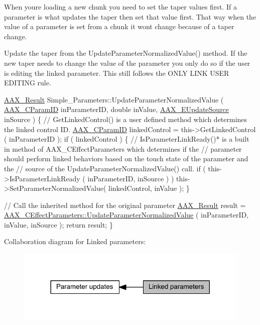 \begin{DoxyEnumerate}
\item When you\textquotesingle{}re loading a new chunk you need to set the taper values first. If a parameter is what updates the taper then set that value first. That way when the value of a parameter is set from a chunk it wont change because of a taper change.
\item Update the taper from the Update\+Parameter\+Normalized\+Value() method. If the new taper needs to change the value of the parameter you only do so if the user is editing the linked parameter. This still follows the O\+N\+L\+Y L\+I\+N\+K U\+S\+E\+R E\+D\+I\+T\+I\+N\+G rule.
\end{DoxyEnumerate}


\begin{DoxyCode}
\hyperlink{a00149_a4d8f69a697df7f70c3a8e9b8ee130d2f}{AAX\_Result} Simple\_Parameters::UpdateParameterNormalizedValue ( 
      \hyperlink{a00149_a1440c756fe5cb158b78193b2fc1780d1}{AAX\_CParamID} inParameterID, \textcolor{keywordtype}{double} inValue, \hyperlink{a00206_a30be0398faf20c6b121239eb9399f3f7}{AAX\_EUpdateSource} inSource )
\{
    \textcolor{comment}{// GetLinkedControl() is a user defined method which determines the linked control ID.}
    \hyperlink{a00149_a1440c756fe5cb158b78193b2fc1780d1}{AAX\_CParamID} linkedControl = this->GetLinkedControl ( inParameterID );
    \textcolor{keywordflow}{if} ( linkedControl )
    \{
        \textcolor{comment}{// IsParameterLinkReady()* is a built in method of AAX\_CEffectParameters which determines if the }
        \textcolor{comment}{// parameter should perform linked behaviors based on the touch state of the parameter and the }
        \textcolor{comment}{// source of the UpdateParameterNormalizedValue() call.}
        \textcolor{keywordflow}{if} ( this->IsParameterLinkReady ( inParameterID, inSource ) )
            this->SetParameterNormalizedValue( linkedControl, inValue );
    \}

    \textcolor{comment}{// Call the inherited method for the original parameter}
    \hyperlink{a00149_a4d8f69a697df7f70c3a8e9b8ee130d2f}{AAX\_Result}   result = 
      \hyperlink{a00018_a56a9f41a975b48f583655db7b43aae5a}{AAX\_CEffectParameters::UpdateParameterNormalizedValue} 
      ( inParameterID, inValue, inSource );
    \textcolor{keywordflow}{return} result;
\}
\end{DoxyCode}
 Collaboration diagram for Linked parameters\+:
\nopagebreak
\begin{figure}[H]
\begin{center}
\leavevmode
\includegraphics[width=317pt]{a00354}
\end{center}
\end{figure}
